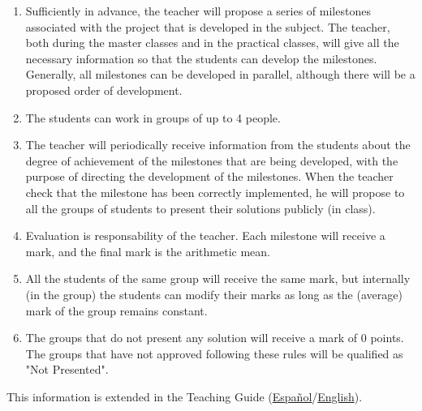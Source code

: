 \begin{enumerate}
\item Sufficiently in advance, the teacher will propose a series of
  milestones associated with the project that is developed in the
  subject. The teacher, both during the master classes and in the
  practical classes, will give all the necessary information so that
  the students can develop the milestones. Generally, all milestones
  can be developed in parallel, although there will be a proposed
  order of development.
\item The students can work in groups of up to 4 people.
\item The teacher will periodically receive information from the
  students about the degree of achievement of the milestones that are
  being developed, with the purpose of directing the development of
  the milestones. When the teacher check that the milestone has been
  correctly implemented, he will propose to all the groups of students
  to present their solutions publicly (in class).
\item Evaluation is responsability of the teacher. Each milestone will
  receive a mark, and the final mark is the arithmetic mean.
\item All the students of the same group will receive the same mark,
  but internally (in the group) the students can modify their marks as
  long as the (average) mark of the group remains constant.
\item The groups that do not present any solution will receive a mark
  of 0 points. The groups that have not approved following these rules
  will be qualified as "Not Presented".
\end{enumerate}

This information is extended in the Teaching Guide
(\href{https://portafirma.ual.es/pfirma/downloadReport/file?idDocument=4Jp82utmug&idRequest=QY36GYcOZQ}{Español}/\href{https://portafirma.ual.es/pfirma/downloadReport/file?idDocument=Zcmom6qigD&idRequest=xXgueuk9oD}{English}).
